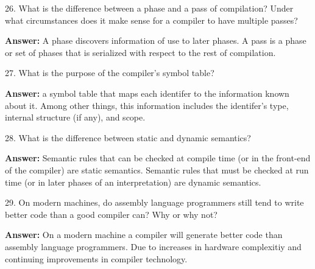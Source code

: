 26. What is the difference between a phase and a pass of compilation? Under what circumstances does it make sense for a compiler to have multiple passes?

\vskip 3mm
{\bf Answer:} A phase discovers information of use to later phases. A pass is a phase or set of phases that is serialized with respect to the rest of compilation.

\filbreak
\vskip 1cm

27. What is the purpose of the compiler's symbol table?

\vskip 3mm

{\bf Answer:} a symbol table that maps each identifer to the information known about it. Among other things, this information includes the identifer's type, internal structure (if any), and scope.

\filbreak
\vskip 1cm

28. What is the difference between static and dynamic semantics?

\vskip 3mm
{\bf Answer:} Semantic rules that can be checked at compile time (or in the front-end of the compiler) are static semantics. Semantic rules that must be checked at run time (or in later phases of an interpretation) are dynamic semantics.

\filbreak
\vskip 1cm

29. On modern machines, do assembly language programmers still tend to write better code than a good compiler can? Why or why not?

\vskip 3mm
{\bf Answer:} On a modern machine a compiler will generate better code than assembly language programmers. Due to increases in hardware complexitiy and continuing improvements in compiler technology.


\filbreak
\vfill\eject
\bye
